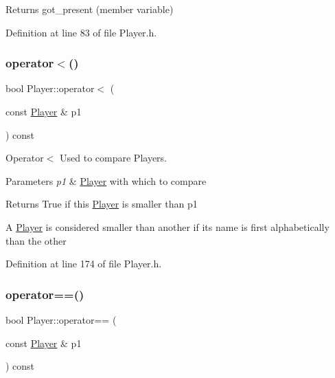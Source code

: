 \begin{DoxyReturn}{Returns}
got\+\_\+present (member variable) 
\end{DoxyReturn}


Definition at line 83 of file Player.\+h.

\hypertarget{class_player_a743a295b67be652909a5b1c3252f0d8c}{}\label{class_player_a743a295b67be652909a5b1c3252f0d8c} 
\subsubsection{\texorpdfstring{operator$<$()}{operator<()}}
{\footnotesize\ttfamily bool Player\+::operator$<$ (\begin{DoxyParamCaption}\item[{const \hyperlink{class_player}{Player} \&}]{p1 }\end{DoxyParamCaption}) const\hspace{0.3cm}{\ttfamily [inline]}}



Operator$<$ Used to compare Players. 


\begin{DoxyParams}{Parameters}
{\em p1} & \hyperlink{class_player}{Player} with which to compare \\
\hline
\end{DoxyParams}
\begin{DoxyReturn}{Returns}
True if this \hyperlink{class_player}{Player} is smaller than p1
\end{DoxyReturn}
A \hyperlink{class_player}{Player} is considered smaller than another if its name is first alphabetically than the other 

Definition at line 174 of file Player.\+h.

\hypertarget{class_player_a81019960e40a67b0cefea0afd3a3100c}{}\label{class_player_a81019960e40a67b0cefea0afd3a3100c} 
\subsubsection{\texorpdfstring{operator==()}{operator==()}}
{\footnotesize\ttfamily bool Player\+::operator== (\begin{DoxyParamCaption}\item[{const \hyperlink{class_player}{Player} \&}]{p1 }\end{DoxyParamCaption}) const\hspace{0.3cm}{\ttfamily [inline]}}



